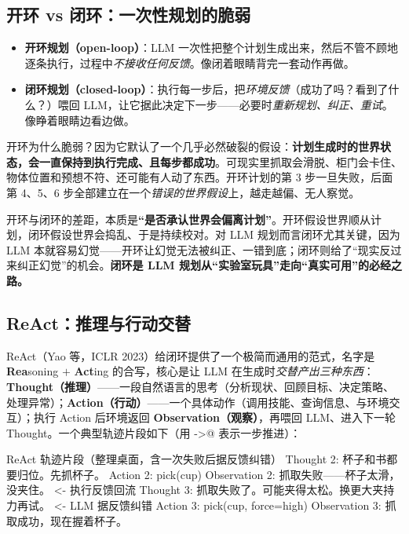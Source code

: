 \subsection{开环 vs 闭环：一次性规划的脆弱}
\label{sec:openvsclosed}

\begin{itemize}
  \item \textbf{开环规划（open-loop）}：LLM 一次性把整个计划生成出来，然后不管不顾地逐条执行，过程中\emph{不接收任何反馈}。像闭着眼睛背完一套动作再做。
  \item \textbf{闭环规划（closed-loop）}：执行每一步后，把\emph{环境反馈}（成功了吗？看到了什么？）喂回 LLM，让它据此决定下一步——必要时\emph{重新规划、纠正、重试}。像睁着眼睛边看边做。
\end{itemize}

\noindent 开环为什么脆弱？因为它默认了一个几乎必然破裂的假设：\textbf{计划生成时的世界状态，会一直保持到执行完成、且每步都成功}。可现实里抓取会滑脱、柜门会卡住、物体位置和预想不符、还可能有人动了东西。开环计划的第 3 步一旦失败，后面第 4、5、6 步全部建立在一个\emph{错误的世界假设}上，越走越偏、无人察觉。

\begin{insight}
开环与闭环的差距，本质是\textbf{“是否承认世界会偏离计划”}。开环假设世界顺从计划，闭环假设世界会捣乱、于是持续校对。对 LLM 规划而言闭环尤其关键，因为 LLM 本就容易幻觉——开环让幻觉无法被纠正、一错到底；闭环则给了“现实反过来纠正幻觉”的机会。\textbf{闭环是 LLM 规划从“实验室玩具”走向“真实可用”的必经之路。}
\end{insight}

\subsection{ReAct：推理与行动交替}
\label{sec:react}

ReAct（Yao 等，ICLR 2023）给闭环提供了一个极简而通用的范式，名字是 \textbf{Rea}soning $+$ \textbf{Act}ing 的合写，核心是让 LLM 在生成时\emph{交替产出三种东西}：\textbf{Thought（推理）}——一段自然语言的思考（分析现状、回顾目标、决定策略、处理异常）；\textbf{Action（行动）}——一个具体动作（调用技能、查询信息、与环境交互）；执行 Action 后环境返回 \textbf{Observation（观察）}，再喂回 LLM、进入下一轮 Thought。一个典型轨迹片段如下（用 \verb@->@ 表示一步推进）：

\begin{codebox}[text]{ReAct 轨迹片段（整理桌面，含一次失败后据反馈纠错）}
Thought 2: 杯子和书都要归位。先抓杯子。
Action  2: pick(cup)
Observation 2: 抓取失败——杯子太滑，没夹住。     <- 执行反馈回流
Thought 3: 抓取失败了。可能夹得太松。换更大夹持力再试。  <- LLM 据反馈纠错
Action  3: pick(cup, force=high)
Observation 3: 抓取成功，现在握着杯子。
\end{codebox}

